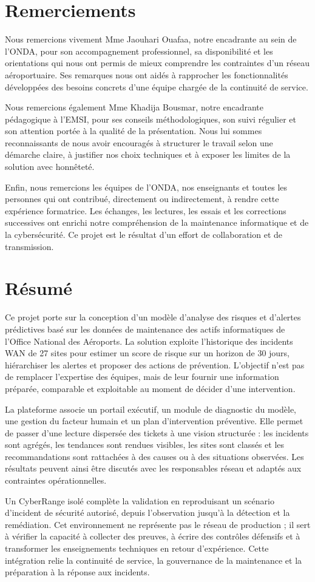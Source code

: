 \documentclass[12pt,a4paper,oneside]{report}
\newcommand{\frontchapter}[1]{%
  \chapter*{#1}%
  \addcontentsline{toc}{chapter}{#1}%
}
\begin{document}
\frontchapter{Remerciements}
Nous remercions vivement Mme Jaouhari Ouafaa, notre encadrante au sein de l’ONDA, pour son accompagnement professionnel, sa disponibilité et les orientations qui nous ont permis de mieux comprendre les contraintes d’un réseau aéroportuaire. Ses remarques nous ont aidés à rapprocher les fonctionnalités développées des besoins concrets d’une équipe chargée de la continuité de service.

Nous remercions également Mme Khadija Bousmar, notre encadrante pédagogique à l’EMSI, pour ses conseils méthodologiques, son suivi régulier et son attention portée à la qualité de la présentation. Nous lui sommes reconnaissants de nous avoir encouragés à structurer le travail selon une démarche claire, à justifier nos choix techniques et à exposer les limites de la solution avec honnêteté.

Enfin, nous remercions les équipes de l’ONDA, nos enseignants et toutes les personnes qui ont contribué, directement ou indirectement, à rendre cette expérience formatrice. Les échanges, les lectures, les essais et les corrections successives ont enrichi notre compréhension de la maintenance informatique et de la cybersécurité. Ce projet est le résultat d’un effort de collaboration et de transmission.

\frontchapter{Résumé}
Ce projet porte sur la conception d’un modèle d’analyse des risques et d’alertes prédictives basé sur les données de maintenance des actifs informatiques de l’Office National des Aéroports. La solution exploite l’historique des incidents WAN de 27 sites pour estimer un score de risque sur un horizon de 30 jours, hiérarchiser les alertes et proposer des actions de prévention. L’objectif n’est pas de remplacer l’expertise des équipes, mais de leur fournir une information préparée, comparable et exploitable au moment de décider d’une intervention.

La plateforme associe un portail exécutif, un module de diagnostic du modèle, une gestion du facteur humain et un plan d’intervention préventive. Elle permet de passer d’une lecture dispersée des tickets à une vision structurée : les incidents sont agrégés, les tendances sont rendues visibles, les sites sont classés et les recommandations sont rattachées à des causes ou à des situations observées. Les résultats peuvent ainsi être discutés avec les responsables réseau et adaptés aux contraintes opérationnelles.

Un CyberRange isolé complète la validation en reproduisant un scénario d’incident de sécurité autorisé, depuis l’observation jusqu’à la détection et la remédiation. Cet environnement ne représente pas le réseau de production ; il sert à vérifier la capacité à collecter des preuves, à écrire des contrôles défensifs et à transformer les enseignements techniques en retour d’expérience. Cette intégration relie la continuité de service, la gouvernance de la maintenance et la préparation à la réponse aux incidents.
\end{document}
